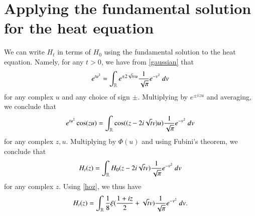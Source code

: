 \section{Applying the fundamental solution for the heat equation}\label{heatflow-sec}

We can write $H_t$ in terms of $H_0$ using the fundamental solution to the heat equation.  Namely, for any $t>0$, we have from \eqref{gaussian} that
$$
e^{tu^2} = \int_{\mathbb{R}} e^{\pm 2 \sqrt{t} vu} \frac{1}{\sqrt{\pi}} e^{-v^2}\ dv$$
for any complex $u$ and any choice of sign $\pm$. Multiplying by $e^{\pm i zu}$ and averaging, we conclude that
$$
e^{tu^2} \cos(zu) = \int_{\mathbb{R}} \cos((z - 2 i \sqrt{t} v)u) \frac{1}{\sqrt{\pi}} e^{-v^2}\ dv$$
for any complex $z,u$.  Multiplying by $\Phi(u)$ and using Fubini's theorem, we conclude that
$$ H_t(z) = \int_{\mathbb{R}} H_0( z - 2i \sqrt{t} v ) \frac{1}{\sqrt{\pi}} e^{-v^2}\ dv $$
for any complex $z$.  Using \eqref{hoz}, we thus have
\begin{equation}\label{htz}
 H_t(z) = \int_{\mathbb{R}} \frac{1}{8} \xi( \frac{1+iz}{2} + \sqrt{t} v ) \frac{1}{\sqrt{\pi}} e^{-v^2}\ dv.
\end{equation}

